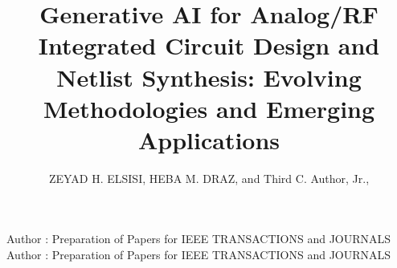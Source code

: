 \documentclass{ieeeaccess}
\begin{document}

\title{Generative AI for Analog/RF Integrated Circuit Design and Netlist Synthesis: Evolving Methodologies and Emerging Applications}
\author{\uppercase{Zeyad H. ElSisi},
	\uppercase{Heba M. Draz}, and Third C. Author,
	Jr.,
	}

\address[1]{National Institute of Standards and
	Technology, Boulder, CO 80305 USA (e-mail: author@boulder.nist.gov)}
\address[2]{Department of Physics, Colorado State University, Fort Collins,
	CO 80523 USA (e-mail: author@lamar.colostate.edu)}
\address[3]{Electrical Engineering Department, University of Colorado, Boulder, CO
	80309 USA}

\markboth
{Author \headeretal: Preparation of Papers for IEEE TRANSACTIONS and JOURNALS}
{Author \headeretal: Preparation of Papers for IEEE TRANSACTIONS and JOURNALS}

\end{document}
